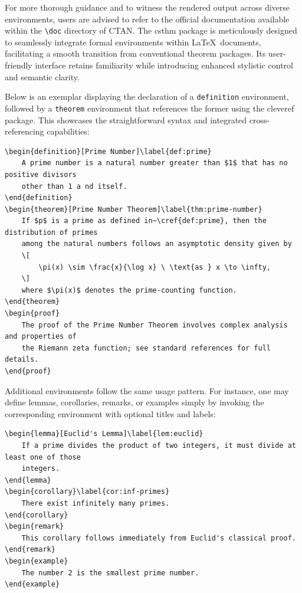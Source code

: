 \documentclass[10pt,letterpaper]{amsart}
\begin{document}
For more thorough guidance and to witness the rendered output across diverse
environments, users are advised to refer to the official documentation
available within the \verb|\doc| directory of CTAN. The \textsf{csthm} package
is meticulously designed to seamlessly integrate formal environments within
\LaTeX\ documents, facilitating a smooth transition from conventional theorem
packages. Its user-friendly interface retains familiarity while introducing
enhanced stylistic control and semantic clarity.

Below is an exemplar displaying the declaration of a \texttt{definition}
environment, followed by a \texttt{theorem} environment that references the
former using the \textsf{cleveref} package. This showcases the straightforward
syntax and integrated cross-referencing capabilities:

\begin{verbatim}
\begin{definition}[Prime Number]\label{def:prime}
    A prime number is a natural number greater than $1$ that has no positive divisors
    other than 1 a nd itself.
\end{definition}
\begin{theorem}[Prime Number Theorem]\label{thm:prime-number}
    If $p$ is a prime as defined in~\cref{def:prime}, then the distribution of primes
    among the natural numbers follows an asymptotic density given by
    \[
        \pi(x) \sim \frac{x}{\log x} \ \text{as } x \to \infty,
    \]
    where $\pi(x)$ denotes the prime-counting function.
\end{theorem}
\begin{proof}
    The proof of the Prime Number Theorem involves complex analysis and properties of 
    the Riemann zeta function; see standard references for full details.
\end{proof}
\end{verbatim}

Additional environments follow the same usage pattern. For instance, one may
define lemmas, corollaries, remarks, or examples simply by invoking the
corresponding environment with optional titles and labels:

\begin{verbatim}
\begin{lemma}[Euclid's Lemma]\label{lem:euclid}
    If a prime divides the product of two integers, it must divide at least one of those
    integers.
\end{lemma}
\begin{corollary}\label{cor:inf-primes}
    There exist infinitely many primes.
\end{corollary}
\begin{remark}
    This corollary follows immediately from Euclid's classical proof.
\end{remark}
\begin{example}
    The number 2 is the smallest prime number.
\end{example}
\end{verbatim}
\end{document}
